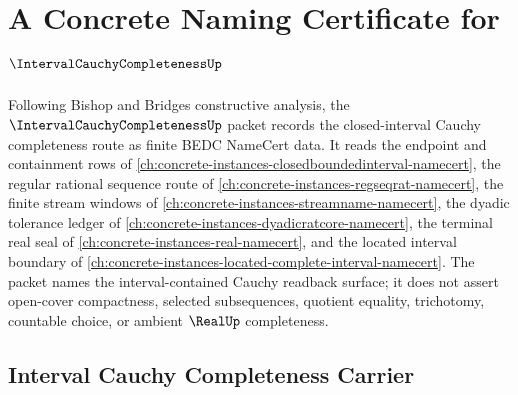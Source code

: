 \chapter{A Concrete Naming Certificate for $\IntervalCauchyCompletenessUp$}
\label{ch:concrete-instances-interval-cauchy-completeness-namecert}

Following Bishop and Bridges constructive analysis, the $\IntervalCauchyCompletenessUp$ packet records the closed-interval Cauchy completeness route as finite BEDC NameCert data. It reads the endpoint and containment rows of \autoref{ch:concrete-instances-closedboundedinterval-namecert}, the regular rational sequence route of \autoref{ch:concrete-instances-regseqrat-namecert}, the finite stream windows of \autoref{ch:concrete-instances-streamname-namecert}, the dyadic tolerance ledger of \autoref{ch:concrete-instances-dyadicratcore-namecert}, the terminal real seal of \autoref{ch:concrete-instances-real-namecert}, and the located interval boundary of \autoref{ch:concrete-instances-located-complete-interval-namecert}. The packet names the interval-contained Cauchy readback surface; it does not assert open-cover compactness, selected subsequences, quotient equality, trichotomy, countable choice, or ambient $\RealUp$ completeness.

\section{Interval Cauchy Completeness Carrier}
\label{sec:interval-cauchy-completeness-carrier}

